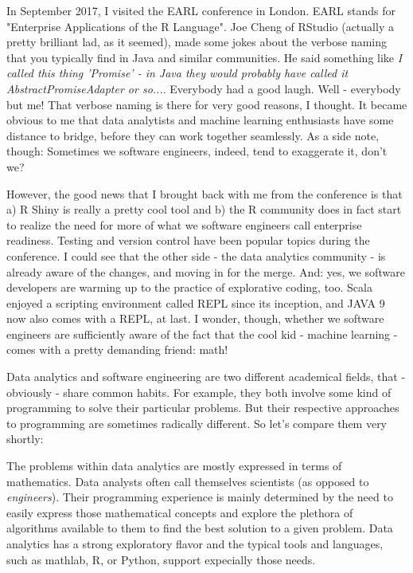 \documentclass[]{report}
\begin{document}
\bigskip

In September 2017, I visited the EARL conference in London. EARL stands for "Enterprise Applications of the R Language". Joe Cheng of RStudio (actually a pretty brilliant lad, as it seemed), made some jokes about the verbose naming that you typically find in Java and similar communities. He said something like \emph{I called this thing 'Promise' - in Java they would probably have called it AbstractPromiseAdapter or so...}. Everybody had a good laugh. Well - everybody but me! That verbose naming is there for very good reasons, I thought. It became obvious to me that data analytists and machine learning enthusiasts have some distance to bridge, before they can work together seamlessly. As a side note, though: Sometimes we software engineers, indeed, tend to exaggerate it, don't we?

However, the good news that I brought back with me from the conference is that a) R Shiny is really a pretty cool tool and b) the R community does in fact start to realize the need for more of what we software engineers call enterprise readiness. Testing and version control have been popular topics during the conference. I could see that the other side - the data analytics community - is already aware of the changes, and moving in for the merge. And: yes, we software developers are warming up to the practice of explorative coding, too. Scala enjoyed a scripting environment called REPL since its inception, and JAVA 9 now also comes with a REPL, at last. I wonder, though, whether we software engineers are sufficiently aware of the fact that the cool kid - machine learning - comes with a pretty demanding friend: math!

\bigskip

Data analytics and software engineering are two different academical fields, that - obviously - share common habits. For example, they both involve some kind of programming to solve their particular problems. But their respective approaches to programming are sometimes radically different. So let's compare them very shortly:

The problems within data analytics are mostly expressed in terms of mathematics. Data analysts often call themselves  scientists (as opposed to \emph{engineers}). Their programming experience is mainly determined by the need to easily express those mathematical concepts and explore the plethora of algorithms available to them to find the best solution to a given problem. Data analytics has a strong exploratory flavor and the typical tools and languages, such as mathlab, R, or Python, support expecially those needs. 
\end{document}
